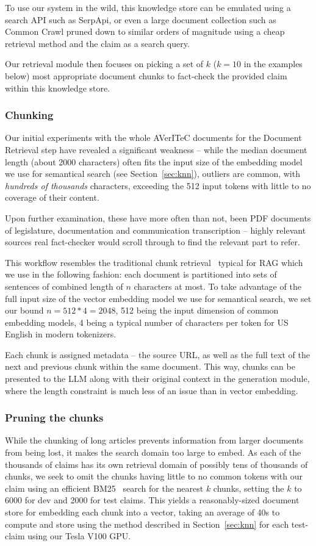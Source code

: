 To use our system in the wild, this knowledge store can be emulated using a search API such as SerpApi, or even a large document collection such as Common Crawl pruned down to similar orders of magnitude using a cheap retrieval method and the claim as a search query.

Our retrieval module then focuses on picking a set of $k$ ($k=10$ in the examples below) most appropriate document chunks to fact-check the provided claim within this knowledge store.

\subsubsection{Chunking}
Our initial experiments with the whole AVerITeC documents for the Document Retrieval step have revealed a significant weakness -- while the median document length (about 2000 characters) often fits the input size of the embedding model we use for semantical search (see Section~\ref{sec:knn}), outliers are common, with \textit{hundreds of thousands} characters, exceeding the 512 input tokens with little to no coverage of their content.

Upon further examination, these have more often than not, been PDF documents of legislature, documentation and communication transcription -- highly relevant sources real fact-checker would scroll through to find the relevant part to refer. 

This workflow resembles the traditional chunk retrieval~ typical for RAG which we use in the following fashion: each document is partitioned into sets of sentences of combined length of $n$ characters at most.
To take advantage of the full input size of the vector embedding model we use for semantical search, we set our bound $n=512*4=2048$, 512 being the input dimension of common embedding models, 4 being a typical number of characters per token for US English in modern tokenizers. 

Each chunk is assigned metadata -- the source URL, as well as the full text of the next and previous chunk within the same document.
This way, chunks can be presented to the LLM along with their original context in the generation module, where the length constraint is much less of an issue than in vector embedding.

\subsubsection{Pruning the chunks}
While the chunking of long articles prevents information from larger documents from being lost, it makes the search domain too large to embed.
As each of the thousands of claims has its own retrieval domain of possibly tens of thousands of chunks, we seek to omit the chunks having little to no common tokens with our claim using an efficient BM25~\cite{bm25} search for the nearest $k$ chunks, setting the $k$ to 6000 for dev and 2000 for test claims. 
This yields a reasonably-sized document store for embedding each chunk into a vector, taking an average of 40s to compute and store using the method described in Section~\ref{sec:knn} for each test-claim using our Tesla V100 GPU.

